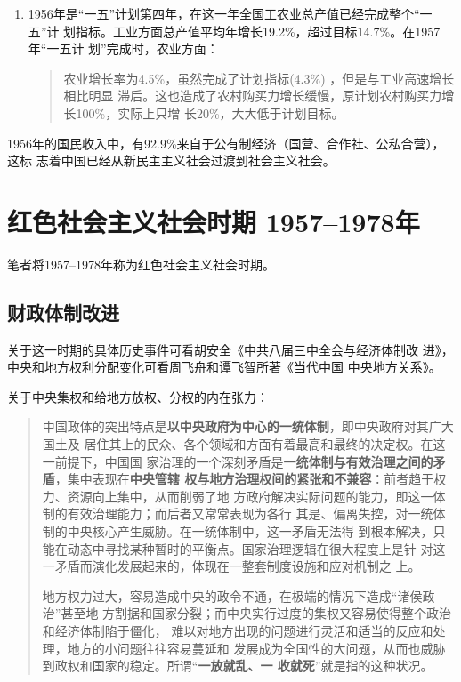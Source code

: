 \begin{enumerate}

\item 1956年是“一五”计划第四年，在这一年全国工农业总产值已经完成整个“一五”计
  划指标。工业方面总产值平均年增长19.2\%，超过目标14.7\%。在1957年“一五计
  划”完成时，农业方面：
  \begin{quotation}
    农业增长率为4.5\%，虽然完成了计划指标(4.3\%) ，但是与工业高速增长相比明显
    滞后。这也造成了农村购买力增长缓慢，原计划农村购买力增长100\%，实际上只增
    长20\%，大大低于计划目标。\cite{shiyiwu}
  \end{quotation}
\end{enumerate}

1956年的国民收入中，有92.9\%来自于公有制经济（国营、合作社、公私合营），这标
志着中国已经从新民主主义社会过渡到社会主义社会。

\section{红色社会主义社会时期 1957--1978年}


笔者将1957--1978年称为红色社会主义社会时期。

\subsection{财政体制改进}

关于这一时期的具体历史事件可看胡安全《中共八届三中全会与经济体制改
进》\cite{DZSY201701010}，中央和地方权利分配变化可看周飞舟和谭飞智所著《当代中国
中央地方关系》\cite{yangdi}。

关于中央集权和给地方放权、分权的内在张力：
\begin{quotation}
  中国政体的突出特点是\textbf{以中央政府为中心的一统体制}，即中央政府对其广大国土及
  居住其上的民众、各个领域和方面有着最高和最终的决定权。在这一前提下，中国国
  家治理的一个深刻矛盾是\textbf{一统体制与有效治理之间的矛盾}，集中表现在\textbf{中央管辖
    权与地方治理权间的紧张和不兼容}：前者趋于权力、资源向上集中，从而削弱了地
  方政府解决实际问题的能力，即这一体制的有效治理能力；而后者又常常表现为各行
  其是、偏离失控，对一统体制的中央核心产生威胁。在一统体制中，这一矛盾无法得
  到根本解决，只能在动态中寻找某种暂时的平衡点。国家治理逻辑在很大程度上是针
  对这一矛盾而演化发展起来的，体现在一整套制度设施和应对机制之
  上。\cite{zhililuoji}

  地方权力过大，容易造成中央的政令不通，在极端的情况下造成“诸侯政治”甚至地
  方割据和国家分裂；而中央实行过度的集权又容易使得整个政治和经济体制陷于僵化，
  难以对地方出现的问题进行灵活和适当的反应和处理，地方的小问题往往容易蔓延和
  发展成为全国性的大问题，从而也威胁到政权和国家的稳定。所谓“\textbf{一放就乱、一
    收就死}”就是指的这种状况。\cite{yangdi}
\end{quotation}

